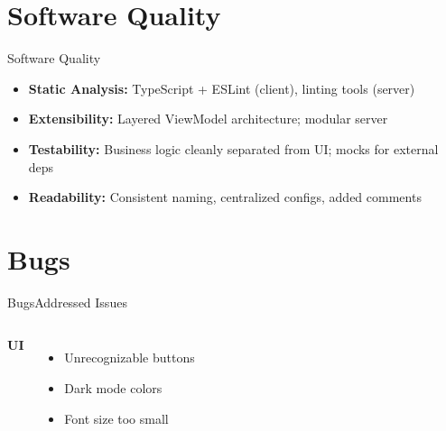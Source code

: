 \documentclass{sdqbeamer}[en]
\begin{document}
\section{Software Quality}

\begin{frame}{Software Quality}
  \begin{itemize}
    \item \textbf{Static Analysis:} TypeScript + ESLint (client), linting tools (server)
    \item \textbf{Extensibility:} Layered ViewModel architecture; modular server
    \item \textbf{Testability:} Business logic cleanly separated from UI; mocks for external deps
    \item \textbf{Readability:} Consistent naming, centralized configs, added comments
  \end{itemize}
\end{frame}


\section{Bugs}

\begin{frame}{Bugs}{Addressed Issues}
  \begin{columns}
    \textbf{UI}
    \begin{itemize}
      \item Unrecognizable buttons
      \item Dark mode colors
      \item Font size too small
    \end{itemize}
  \end{columns}
\end{frame}
\end{document}
